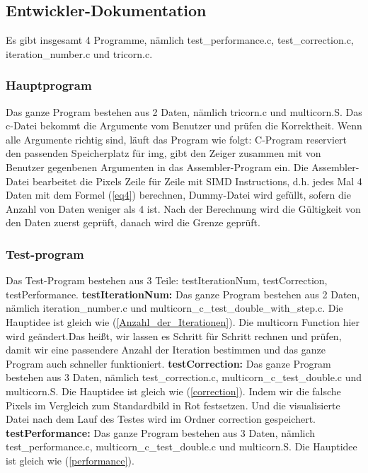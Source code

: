\documentclass[course=erap]{aspdoc}
\begin{document}
\subsection{Entwickler-Dokumentation}
Es gibt insgesamt 4 Programme, nämlich test\_performance.c, test\_correction.c, iteration\_number.c und tricorn.c.
\subsubsection{Hauptprogram}
Das ganze Program bestehen aus 2 Daten, nämlich tricorn.c und multicorn.S. Das c-Datei bekommt die Argumente vom Benutzer und prüfen die Korrektheit. Wenn alle Argumente richtig sind, läuft das Program wie folgt: \newline
C-Program reserviert den passenden Speicherplatz für img, gibt den Zeiger zusammen mit von Benutzer gegenbenen Argumenten in das Assembler-Program ein. Die Assembler-Datei bearbeitet die Pixels Zeile für Zeile mit SIMD Instructions, d.h. jedes Mal 4 Daten mit dem Formel (\ref{eq4}) berechnen, Dummy-Datei wird gefüllt, sofern die Anzahl von Daten weniger als 4 ist. Nach der Berechnung wird die Gültigkeit von den Daten zuerst geprüft, danach wird die Grenze geprüft.
\subsubsection{Test-program}
Das Test-Program bestehen aus 3 Teile: testIterationNum, testCorrection, testPerformance.\newline
\textbf{testIterationNum:} Das ganze Program bestehen aus 2 Daten, nämlich iteration\_number.c und multicorn\_c\_test\_double\_with\_step.c. Die Hauptidee ist gleich wie  (\ref{Anzahl_der_Iterationen}). Die multicorn Function hier wird geändert.Das heißt, wir lassen es Schritt für Schritt rechnen und prüfen, damit wir eine passendere Anzahl der Iteration bestimmen und das ganze Program auch schneller funktioniert. \newline
\textbf{testCorrection:} Das ganze Program bestehen aus 3 Daten, nämlich test\_correction.c, multicorn\_c\_test\_double.c und multicorn.S. Die Hauptidee ist gleich wie  (\ref{correction}). Indem wir die falsche Pixels im Vergleich zum Standardbild in Rot festsetzen. Und die visualisierte Datei nach dem Lauf des Testes wird im Ordner correction gespeichert.\newline
\textbf{testPerformance:} Das ganze Program bestehen aus 3 Daten, nämlich test\_performance.c, multicorn\_c\_test\_double.c und multicorn.S. Die Hauptidee ist gleich wie  (\ref{performance}).
\end{document}
